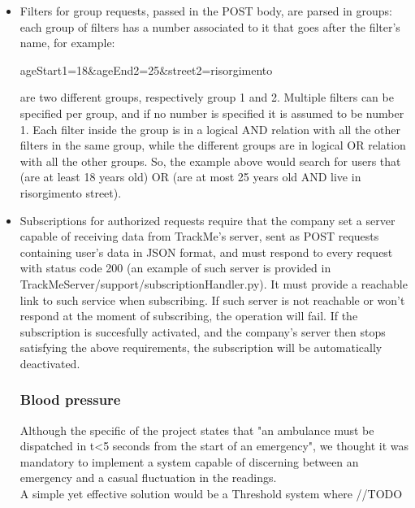 \documentclass[../main.tex]{subfiles}
\begin{document}
\begin{itemize}

	\item Filters for group requests, passed in the POST body, are parsed in groups: each group of filters has a number associated to it that goes after the filter's name, for example:

	 ageStart1=18\&ageEnd2=25\&street2=risorgimento

	 are two different groups, respectively group 1 and 2. Multiple filters can be specified per group, and if no number is specified it is assumed to be number 1. Each filter inside the group is in a logical AND relation with all the other filters in the same group, while the different groups are in logical OR relation with all the other groups. So, the example above would search for users that (are at least 18 years old) OR (are at most 25 years old AND live in risorgimento street).
	\item Subscriptions for authorized requests require that the company set a server capable of receiving data from TrackMe's server, sent as POST requests containing user's data in JSON format, and must respond to every request with status code 200 (an example of such server is provided in TrackMeServer/support/subscriptionHandler.py). It must provide a reachable link to such service when subscribing. If such server is not reachable or won't respond at the moment of subscribing, the operation will fail. If the subscription is succesfully activated, and the company's server then stops satisfying the above requirements, the subscription will be automatically deactivated.
	
	\subsubsection{Blood pressure}
	Although the specific of the project states that "an ambulance must be dispatched in t<5 seconds from the start of an emergency", 
	we thought it was mandatory to implement a system capable of discerning between an emergency and a casual fluctuation in the readings.\\
	A simple yet effective solution would be a Threshold system where //TODO
\end{itemize}
\end{document}
